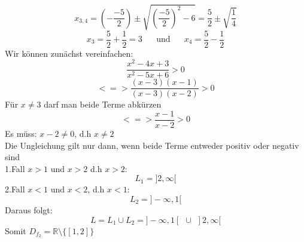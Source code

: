 \documentclass[11pt]{article}
\begin{document}
						$$x_{3,4}=\left(-\frac{-5}{2}\right)\pm \sqrt{\left(\frac{-5}{2}\right)^2-6}= \frac{5}{2} \pm \sqrt{\frac{1}{4}}$$
						$$x_3=\frac{5}{2}+\frac{1}{2}=3 \hspace{20pt}\mbox{und}\hspace{20pt} x_4=\frac{5}{2}-\frac{1}{2}$$
						Wir können zunächst vereinfachen:
						$$\frac{x^2-4x+3}{x^2-5x+6}>0$$
						$$<=>\frac{(x-3)(x-1)}{(x-3)(x-2)}>0$$
						Für $x \neq 3$ darf man beide Terme abkürzen
						$$<=>\frac{x-1}{x-2}>0$$
						Es müss: $x-2\neq 0$, d.h $x \neq 2$\\
						Die Ungleichung gilt nur dann, wenn beide Terme entweder positiv oder negativ sind\\
						1.Fall $x>1$ und $x>2$ d.h $x>2$:
							$$L_1=]2,\infty[$$
						2.Fall $x<1$ und $x<2$, d.h $x<1$:
							$$L_2=]-\infty,1[$$
						Daraus folgt:\\
						$$L=L_1\cup L_2 = ]-\infty,1[ \hspace{5pt} \cup \hspace{5pt} ]2,\infty[$$
						Somit $D_{f_2}=\mathbb{R}\setminus\{[1,2]\}$						
\end{document}
